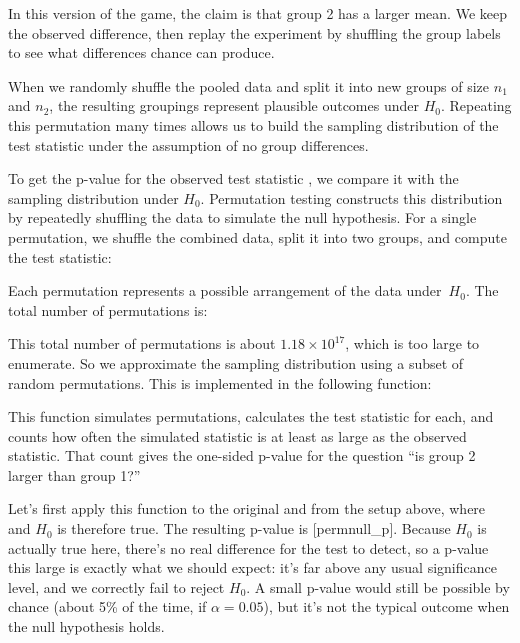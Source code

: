 \begin{example}
In this version of the game, the claim is that group 2 has a larger
mean. We keep the observed difference, then replay the experiment by
shuffling the group labels to see what differences chance can produce.

When we randomly shuffle the pooled data  
and split it into new groups of size $n_1$ and $n_2$, the resulting 
groupings represent plausible outcomes under $H_0$. Repeating this 
permutation many times allows us to build the sampling distribution 
of the test statistic under the assumption of no group differences.


To get the p-value for the observed test statistic , we
compare it with the sampling distribution under $H_0$. Permutation
testing constructs this distribution by repeatedly shuffling the data
to simulate the null hypothesis. For a single permutation, we shuffle
the combined data, split it into two groups, and compute the test
statistic:


Each permutation represents a possible arrangement of the data
under~$H_0$. The total number of permutations is:

This total number of permutations is about $1.18 \times 10^{17}$,
which is too large to enumerate. So we approximate the sampling
distribution using a subset of random permutations.
This is implemented in the following function:

This function simulates  permutations, calculates the test
statistic for each, and counts how often the simulated statistic is at
least as large as the observed statistic. That count gives the
one-sided p-value for the question ``is group 2 larger than group 1?''

Let's first apply this function to the original  and
 from the setup above, where  and $H_0$ is
therefore true.
The resulting p-value is
[permnull_p]. Because $H_0$ is
actually true here, there's no real difference for the test to
detect, so a p-value this large is exactly what we should expect: it's
far above any usual significance level, and we correctly fail to
reject $H_0$. A small p-value would still be possible by chance (about
5\% of the time, if $\alpha = 0.05$), but it's not the typical
outcome when the null hypothesis holds.


\end{example}
